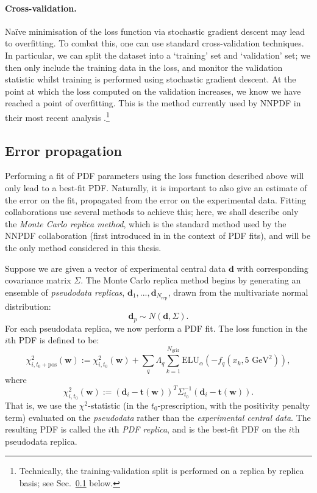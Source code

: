\documentclass[withindex,glossary]{cam-thesis}
\renewcommand{\vec}[1]{\textbf{#1}} %
\begin{document}
\paragraph{Cross-validation.} Na\"{i}ve minimisation of the loss function via stochastic gradient descent may lead to overfitting. To combat this, one can use standard cross-validation techniques. In particular, we can split the dataset into a `training' set and `validation' set; we then only include the training data in the loss, and monitor the validation statistic whilst training is performed using stochastic gradient descent. At the point at which the loss computed on the validation increases, we know we have reached a point of overfitting. This is the method currently used by NNPDF in their most recent analysis \cite{NNPDF:2021njg}.\footnote{Technically, the training-validation split is performed on a replica by replica basis; see Sec.~\ref{sec:pdf_error_propagation} below.}

\subsection{Error propagation}
\label{sec:pdf_error_propagation}
Performing a fit of PDF parameters using the loss function described above will only lead to a best-fit PDF. Naturally, it is important to also give an estimate of the error on the fit, propagated from the error on the experimental data. Fitting collaborations use several methods to achieve this; here, we shall describe only the \textit{Monte Carlo replica method}, which is the standard method used by the NNPDF collaboration (first introduced in \cite{DelDebbio:2004xtd} in the context of PDF fits), and will be the only method considered in this thesis.

Suppose we are given a vector of experimental central data $\vec{d}$ with corresponding covariance matrix $\Sigma$. The Monte Carlo replica method begins by generating an ensemble of \textit{pseudodata replicas}, $\vec{d}_1, ..., \vec{d}_{N_{\text{rep}}}$, drawn from the multivariate normal distribution:
\begin{equation}
\vec{d}_p \sim N(\vec{d}, \Sigma).
\end{equation}
For each pseudodata replica, we now perform a PDF fit. The loss function in the $i$th PDF is defined to be:
\begin{equation}
\chi^2_{i, t_0 + \text{pos}}(\vec{w}) := \chi^2_{i,t_0}(\vec{w}) + \sum_{q} \Lambda_q \sum_{k=1}^{N_{\text{grid}}} \textrm{ELU}_{\alpha}\left( - f_q(x_k, 5 \text{ GeV}^2) \right),
\end{equation}
where
\begin{equation}
\chi^2_{i,t_0}(\vec{w}) := (\vec{d}_i - \vec{t}(\vec{w}))^T \Sigma_{t_0}^{-1} (\vec{d}_ i - \vec{t}(\vec{w})).
\end{equation}
That is, we use the $\chi^2$-statistic (in the $t_0$-prescription, with the positivity penalty term) evaluated on the \textit{pseudodata} rather than the \textit{experimental central data}. The resulting PDF is called the $i$th \textit{PDF replica}, and is the best-fit PDF on the $i$th pseudodata replica. 
\end{document}
